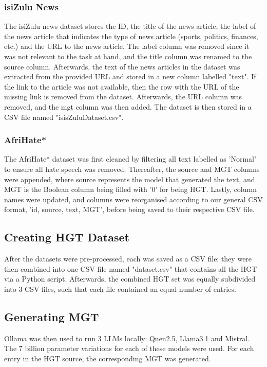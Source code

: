 \documentclass[11pt]{article}
\begin{document}
    \subsubsection{isiZulu News}
    The isiZulu news dataset \citep{isiZuluNews} stores the ID, the title of the news 
    article, the label of the news article that indicates the type of news article 
    (sports, politics, finances, etc.) and the URL to the news article. The label 
    column was removed since it was not relevant to the task at hand, and the title 
    column was renamed to the source column. Afterwards, the text of the news articles 
    in the dataset was extracted from the provided URL and stored in a new column labelled 
    "text". If the link to the article was not available, then the row with the URL of the 
    missing link is removed from the dataset. Afterwards, the URL column was removed, and 
    the mgt column was then added. The dataset is then stored in a CSV file named 
    "isisZuluDataset.csv".

    \subsubsection{AfriHate*}
    The AfriHate* dataset \citep{Afrihate*} was first cleaned by filtering all text labelled 
    as 'Normal' to ensure all hate speech was removed. Thereafter, the source and MGT columns 
    were appended, where source represents the model that generated the text, and MGT is the 
    Boolean column being filled with '0' for being HGT. Lastly, column names were updated, and 
    columns were reorganised according to our general CSV format, 'id, source, text, MGT', before 
    being saved to their respective CSV file.

    
    \subsection{Creating HGT Dataset}
    After the datasets were pre-processed, each was saved as a CSV file; they were then combined 
    into one CSV file named "dataset.csv" that contains all the HGT via a Python script. Afterwards, 
    the combined HGT set was equally subdivided into 3 CSV files, such that each file contained an 
    equal number of entries.

    \subsection{Generating MGT}
    Ollama was then used to run 3 LLMs locally: Quen2.5, Llama3.1 and Mistral. The 7 billion parameter 
    variations for each of these models were used. For each entry in the HGT source, the corresponding 
    MGT was generated.
\end{document}
